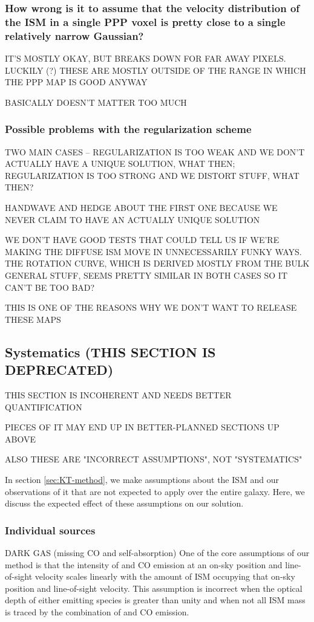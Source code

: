 \subsubsection{How wrong is it to assume that the velocity distribution of the ISM in a single PPP voxel is pretty close to a single relatively narrow Gaussian?}
IT'S MOSTLY OKAY, BUT BREAKS DOWN FOR FAR AWAY PIXELS. LUCKILY (?) THESE ARE MOSTLY OUTSIDE OF THE RANGE IN WHICH THE PPP MAP IS GOOD ANYWAY

BASICALLY DOESN'T MATTER TOO MUCH

\subsubsection{Possible problems with the regularization scheme}
TWO MAIN CASES -- REGULARIZATION IS TOO WEAK AND WE DON'T ACTUALLY HAVE A UNIQUE SOLUTION, WHAT THEN; REGULARIZATION IS TOO STRONG AND WE DISTORT STUFF, WHAT THEN?

HANDWAVE AND HEDGE ABOUT THE FIRST ONE BECAUSE WE NEVER CLAIM TO HAVE AN ACTUALLY UNIQUE SOLUTION

WE DON'T HAVE GOOD TESTS THAT COULD TELL US IF WE'RE MAKING THE DIFFUSE ISM MOVE IN UNNECESSARILY FUNKY WAYS. THE ROTATION CURVE, WHICH IS DERIVED MOSTLY FROM THE BULK GENERAL STUFF, SEEMS PRETTY SIMILAR IN BOTH CASES SO IT CAN'T BE TOO BAD? 

THIS IS ONE OF THE REASONS WHY WE DON'T WANT TO RELEASE THESE MAPS

\subsection{Systematics (THIS SECTION IS DEPRECATED)}
THIS SECTION IS INCOHERENT AND NEEDS BETTER QUANTIFICATION

PIECES OF IT MAY END UP IN BETTER-PLANNED SECTIONS UP ABOVE

ALSO THESE ARE "INCORRECT ASSUMPTIONS", NOT "SYSTEMATICS"

In section \ref{sec:KT-method}, we make assumptions about the ISM and our observations of it that are not expected to apply over the entire galaxy. Here, we discuss the expected effect of these assumptions on our solution.
\subsubsection{Individual sources}
DARK GAS (missing CO and \atomH self-absorption)
One of the core assumptions of our method is that the intensity of \atomH and CO emission at an on-sky position and line-of-sight velocity scales linearly with the amount of ISM occupying that on-sky position and line-of-sight velocity. This assumption is incorrect when the optical depth of either emitting species is greater than unity and when not all ISM mass is traced by the combination of \atomH and CO emission. 

